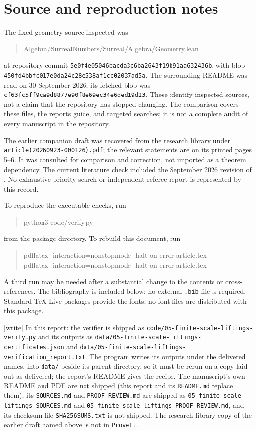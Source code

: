 \documentclass[11pt,a4paper]{article}
\numberwithin{equation}{section}
\theoremstyle{plain}
\newcommand{\wtag}{\textup{[write]}}%
\newcommand{\repo}{\texttt{ProveIt}}
\begin{document}
\section{Source and reproduction notes}

The fixed geometry source inspected was
\begin{quote}\small\ttfamily
Algebra/SurrealNumbers/Surreal/Algebra/Geometry.lean
\end{quote}
at repository commit
\nolinkurl{5e0f4e05046bacda3c6ba2643f19b91aa632436b}, with blob
\nolinkurl{450fd4bbfc017e0da24c28e538af1cc02037ad5a}. The surrounding README
was read on 30 September 2026; its fetched blob was
\nolinkurl{cf63fc5ff9ca9d8877e90f8e69ec34e6ded19d23}. These identify inspected
sources, not a claim that the repository has stopped changing. The
comparison covers these files, the reports guide, and targeted searches;
it is not a complete audit of every manuscript in the repository.

The earlier companion draft was recovered from the research library under
\nolinkurl{article(20260923-000126).pdf}; the relevant statements are on its
printed pages 5--6. It was consulted for comparison and correction, not
imported as a theorem dependency. The current literature check included
the September 2026 revision of \cite{fs:CCFL}. No exhaustive priority search
or independent referee report is represented by this record.

To reproduce the executable checks, run
\begin{quote}\ttfamily
python3 code/verify.py
\end{quote}
from the package directory. To rebuild this document, run
\begin{quote}\ttfamily
pdflatex -interaction=nonstopmode -halt-on-error article.tex\\
pdflatex -interaction=nonstopmode -halt-on-error article.tex
\end{quote}
A third run may be needed after a substantial change to the contents or
cross-references. The bibliography is included below; no external
\texttt{.bib} file is required. Standard TeX Live packages provide the
fonts; no font files are distributed with this package.

\wtag{} In this report: the verifier is shipped as
\nolinkurl{code/05-finite-scale-liftings-verify.py} and its outputs as
\nolinkurl{data/05-finite-scale-liftings-certificates.json} and
\nolinkurl{data/05-finite-scale-liftings-verification_report.txt}. The
program writes its outputs under the delivered names, into
\nolinkurl{data/} beside its parent directory, so it must be rerun on a copy
laid out as delivered; the report's README gives the recipe. The manuscript's
own README and PDF are not shipped (this report and its \nolinkurl{README.md}
replace them); its \nolinkurl{SOURCES.md} and \nolinkurl{PROOF_REVIEW.md} are
shipped as \nolinkurl{05-finite-scale-liftings-SOURCES.md} and
\nolinkurl{05-finite-scale-liftings-PROOF_REVIEW.md}, and its checksum file
\nolinkurl{SHA256SUMS.txt} is not shipped. The research-library copy of the
earlier draft named above is not in \repo{}.
\end{document}
